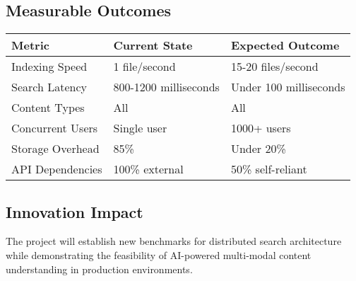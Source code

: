 \documentclass[11pt,a4paper]{article}
\begin{document}
\subsection{Measurable Outcomes}
\begin{tabularx}{\textwidth}{|X|X|X|}
\hline
\textbf{Metric} & \textbf{Current State} & \textbf{Expected Outcome} \\
\hline
Indexing Speed & 1 file/second & 15-20 files/second \\
\hline
Search Latency & 800-1200 milliseconds & Under 100 milliseconds \\
\hline
Content Types & All & All \\
\hline
Concurrent Users & Single user & 1000+ users \\
\hline
Storage Overhead & 85\% & Under 20\% \\
\hline
API Dependencies & 100\% external & 50\% self-reliant \\
\hline
\end{tabularx}

\subsection{Innovation Impact}
The project will establish new benchmarks for distributed search architecture while demonstrating the feasibility of AI-powered multi-modal content understanding in production environments.



\end{document}

